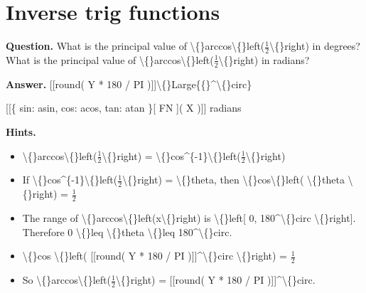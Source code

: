 \documentclass{article}
\begin{document}
\section*{Inverse trig functions}
\textbf{Question.} What is the principal value of \textbackslash\{\}arccos\textbackslash\{\}left($\frac{1}{2}$\textbackslash\{\}right) in degrees?
                    What is the principal value of \textbackslash\{\}arccos\textbackslash\{\}left($\frac{1}{2}$\textbackslash\{\}right) in radians?

\textbf{Answer.} [[round( Y * 180 / PI )]]\textbackslash\{\}Large\{\{\}\textasciicircum{}\textbackslash\{\}circ\}
                    
                    
                        [[\{
                sin: asin,
                cos: acos,
                tan: atan
            \}[ FN ]( X )]] radians

\textbf{Hints.}
\begin{itemize}
  \item \textbackslash\{\}arccos\textbackslash\{\}left($\frac{1}{2}$\textbackslash\{\}right) = \textbackslash\{\}cos\textasciicircum{}\{-1\}\textbackslash\{\}left($\frac{1}{2}$\textbackslash\{\}right)
  \item If \textbackslash\{\}cos\textasciicircum{}\{-1\}\textbackslash\{\}left($\frac{1}{2}$\textbackslash\{\}right) = \textbackslash\{\}theta,
                then \textbackslash\{\}cos\textbackslash\{\}left( \textbackslash\{\}theta \textbackslash\{\}right) = $\frac{1}{2}$
  \item The range of \textbackslash\{\}arccos\textbackslash\{\}left(x\textbackslash\{\}right) is \textbackslash\{\}left[ 0, 180\textasciicircum{}\textbackslash\{\}circ \textbackslash\{\}right].
                Therefore 0 \textbackslash\{\}leq \textbackslash\{\}theta \textbackslash\{\}leq 180\textasciicircum{}\textbackslash\{\}circ.
  \item \textbackslash\{\}cos \textbackslash\{\}left( [[round( Y * 180 / PI )]]\textasciicircum{}\textbackslash\{\}circ \textbackslash\{\}right) = $\frac{1}{2}$
  \item So \textbackslash\{\}arccos\textbackslash\{\}left($\frac{1}{2}$\textbackslash\{\}right) = [[round( Y * 180 / PI )]]\textasciicircum{}\textbackslash\{\}circ.
\end{itemize}
\end{document}
